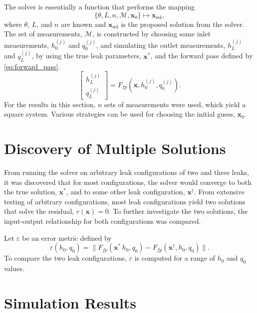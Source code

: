 
The solver is essentially a function that performs the mapping
\begin{equation*}
    \{\theta, L,n,\mathcal{M},\mathbf{x}_0\} \mapsto \mathbf{x}_{\text{sol}},
\end{equation*}
where $\theta$, $L$, and $n$ are known and $\mathbf{x}_{\text{sol}}$ is the proposed solution from the solver. The set of measurements, $\mathcal{M}$, is constructed by choosing some inlet measurements, $h_0^{(j)}$ and $q_0^{(j)}$, and simulating the outlet measurements, $h_L^{(j)}$ and $q_L^{(j)}$, by using the true leak parameters, $\mathbf{x^*}$, and the forward pass defined by \cref{eq:forward_pass}.
\begin{equation*}
    \begin{bmatrix}
        h_L^{(j)}\\
        q_L^{(j)}
    \end{bmatrix}
    = F_{fp}(\mathbf{x}, h_0^{(j)},q_0^{(j)}).
\end{equation*}
For the results in this section, $n$ sets of measurements were used, which yield a square system. Various strategies can be used for choosing the initial guess, $\mathbf{x}_0$.

\section{Discovery of Multiple Solutions}
\label{sec:result_multiple_solutions}

From running the solver on arbitrary leak configurations of two and three leaks, it was discovered that for most configurations, the solver would converge to both the true solution, $\mathbf{x}^*$, and to some other leak configuration, $\mathbf{x}^\dagger$. From extensive testing of arbitrary configurations, most leak configurations yield two solutions that solve the residual, $r(\mathbf{x})=0$. To further investigate the two solutions, the input-output relationship for both configurations was compared.

Let $\varepsilon$ be an error metric defined by
\begin{equation*}
    \varepsilon(h_0,q_0) = \|F_{fp}(\mathbf{x}^*\,h_0,q_0)-F_{fp}(\mathbf{x}^\dagger,h_0,q_0)\|.
\end{equation*}
To compare the two leak configurations, $\varepsilon$ is computed for a range of $h_0$ and $q_0$ values.



\section{Simulation Results}

